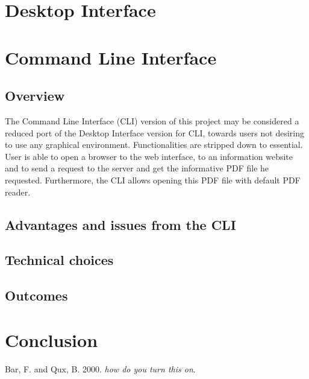 \documentclass[a4paper,12pt, twocolumn]{article}
\begin{document}
\section*{Desktop Interface}

\section*{Command Line Interface}

\subsection*{Overview}

The Command Line Interface (CLI) version of this project may be considered a reduced port of the Desktop Interface version for CLI, towards users not desiring to use any graphical environment. Functionalities are stripped down to essential. User is able to open a browser to the web interface, to an information website and to send a request to the server and get the informative PDF file he requested. Furthermore, the CLI allows opening this PDF file with default PDF reader.

\subsection*{Advantages and issues from the CLI}



\subsection*{Technical choices}



\subsection*{Outcomes}

\section*{Conclusion}

\begin{thebibliography}{9}

  Bar, F. and Qux, B. 2000. \emph{how do you turn this on}.	%
  
\end{thebibliography}
\end{document}
